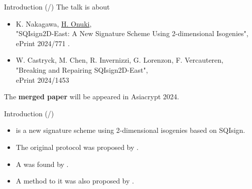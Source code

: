 \newcommand*{\introTotal}{\total{intro}}
\begin{frame}{Introduction (/\introTotal{})}
    The talk is about 

    \begin{itemize}
        \setlength{\itemsep}{10pt}
        \item K. Nakagawa, \underline{H. Onuki},\\
            "SQIsign2D-East: A New Signature Scheme Using 2-dimensional Isogenies",\\
            ePrint 2024/771
            \cite{no2024sqisign2d}.

        \item W. Castryck, M. Chen, R. Invernizzi, G. Lorenzon, F. Vercauteren,\\
                "Breaking and Repairing SQIsign2D-East",\\
                ePrint 2024/1453
                \cite{CCILV2024sqisign2d_attack}
    \end{itemize}

    \vspace{10pt}
    The \textbf{merged paper} will be appeared in Asiacrypt 2024.
\end{frame}

\begin{frame}{Introduction (/\introTotal{})}
    \begin{itemize}
        \setlength{\itemsep}{10pt}
        \item {} is a new signature scheme using 2-dimensional isogenies based on SQIsign.
        \item The original protocol was proposed by \cite{no2024sqisign2d}.
        \item A  was found by \cite{CCILV2024sqisign2d_attack}.
        \item A method to  it was also proposed by \cite{CCILV2024sqisign2d_attack}.
    \end{itemize}
\end{frame}

